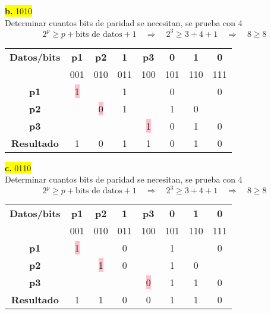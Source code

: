 \documentclass{article}
\begin{document}
		\begin{center}
		\hspace{3cm}\colorbox{yellow}{{\textbf{b.} 1010}}\newline
		\\Determinar cuantos bits de paridad se necesitan, se prueba con 4
		\[
		2^p \geq p + \text{bits de datos} + 1
		\quad \Rightarrow \quad	2^3 \geq 3 + 4 + 1 \quad \Rightarrow \quad 8 \geq 8
		\]
		
		\begin{table}[h!]
			\centering
			\begin{tabular}{c|ccccccc}
				\toprule
				\textbf{Datos/bits} & \textbf{p1} & \textbf{p2} & \textbf{1} & \textbf{p3} & \textbf{0} & \textbf{1} & \textbf{0}\\ & \scriptsize001 & \scriptsize010 & \scriptsize011 & \scriptsize100 & \scriptsize101 & \scriptsize110 & \scriptsize111\\
				\midrule
				\textbf{p1} & \colorbox{pink}{1} & & 1 & & 0 & & 0\\
				\midrule
				\textbf{p2} &  & \colorbox{pink}{0} & 1 & & 1 & 0  \\
				\midrule
				\textbf{p3} & & & & \colorbox{pink}{1} & 0 & 1 & 0 \\
				\midrule
				\textbf{Resultado} & 1 & 0 & 1 & 1 & 0 & 1 & 0\\
				\bottomrule
			\end{tabular}
		\end{table}
	\end{center}
		\begin{center}
		\hspace{3cm}\colorbox{yellow}{{\textbf{c.} 0110}}\newline
		\\Determinar cuantos bits de paridad se necesitan, se prueba con 4
		\[
		2^p \geq p + \text{bits de datos} + 1
		\quad \Rightarrow \quad	2^3 \geq 3 + 4 + 1 \quad \Rightarrow \quad 8 \geq 8
		\]
		
		\begin{table}[h!]
			\centering
			\begin{tabular}{c|ccccccc}
				\toprule
				\textbf{Datos/bits} & \textbf{p1} & \textbf{p2} & \textbf{1} & \textbf{p3} & \textbf{0} & \textbf{1} & \textbf{0}\\ & \scriptsize001 & \scriptsize010 & \scriptsize011 & \scriptsize100 & \scriptsize101 & \scriptsize110 & \scriptsize111\\
				\midrule
				\textbf{p1} & \colorbox{pink}{1} & & 0 & & 1 & & 0\\
				\midrule
				\textbf{p2} &  & \colorbox{pink}{1} & 0 & & 1 & 0  \\
				\midrule
				\textbf{p3} & & & & \colorbox{pink}{0} & 1 & 1 & 0 \\
				\midrule
				\textbf{Resultado} & 1 & 1 & 0 & 0 & 1 & 1 & 0\\
				\bottomrule
			\end{tabular}
		\end{table}
	\end{center}
\end{document}
